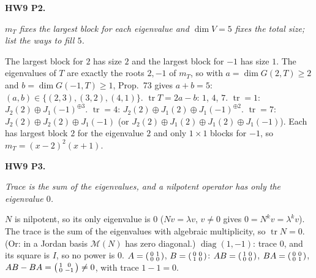 \documentclass[10pt]{scrartcl}
\DeclareMathOperator{\tr}{tr}
\newcommand{\MM}{\mathcal M}
\newcommand{\idea}[1]{{\color{OliveGreen!75!black}\textbf{Idea.}} \textit{#1}\par}
\newenvironment{prob}{\par\medskip\noindent\begin{minipage}{\linewidth}\setlength{\parskip}{3pt}}{\end{minipage}\par}
\begin{document}
\begin{prob}
\textbf{HW9 P2. }\par 
\begin{enumerate}[(a)]
  \ii \idea{$m_T$ fixes the largest block for each eigenvalue and $\dim V=5$ fixes the total size; list the ways to fill $5$.}The largest block for $2$ has size $2$ and the largest block for $-1$ has size $1$. The eigenvalues of $T$ are exactly the roots $2,-1$ of $m_T$, so with $a=\dim G(2,T)\ge2$ and $b=\dim G(-1,T)\ge1$, Prop.~73 gives $a+b=5$: $(a,b)\in\{(2,3),(3,2),(4,1)\}$.
  \ii $\tr T=2a-b$: $1$, $4$, $7$.
  \ii $\tr=1$: $J_2(2)\oplus J_1(-1)^{\oplus3}$. $\tr=4$: $J_2(2)\oplus J_1(2)\oplus J_1(-1)^{\oplus2}$. $\tr=7$: $J_2(2)\oplus J_2(2)\oplus J_1(-1)$ (or $J_2(2)\oplus J_1(2)\oplus J_1(2)\oplus J_1(-1)$). Each has largest block $2$ for the eigenvalue $2$ and only $1\times1$ blocks for $-1$, so $m_T=(x-2)^2(x+1)$.
\end{enumerate}
\end{prob}

\begin{prob}
\textbf{HW9 P3. }\par 
\begin{enumerate}[(a)]
  \ii \idea{Trace is the sum of the eigenvalues, and a nilpotent operator has only the eigenvalue $0$.}$N$ is nilpotent, so its only eigenvalue is $0$ ($Nv=\lambda v$, $v\ne0$ gives $0=N^kv=\lambda^kv$). The trace is the sum of the eigenvalues with algebraic multiplicity, so $\tr N=0$. (Or: in a Jordan basis $\MM(N)$ has zero diagonal.)
  \ii $\operatorname{diag}(1,-1)$: trace $0$, and its square is $I$, so no power is $0$.
  \ii $A=\begin{psmallmatrix}0&1\\0&0\end{psmallmatrix}$, $B=\begin{psmallmatrix}0&0\\1&0\end{psmallmatrix}$: $AB=\begin{psmallmatrix}1&0\\0&0\end{psmallmatrix}$, $BA=\begin{psmallmatrix}0&0\\0&1\end{psmallmatrix}$, $AB-BA=\begin{psmallmatrix}1&0\\0&-1\end{psmallmatrix}\ne0$, with trace $1-1=0$.
\end{enumerate}
\end{prob}
\end{document}
